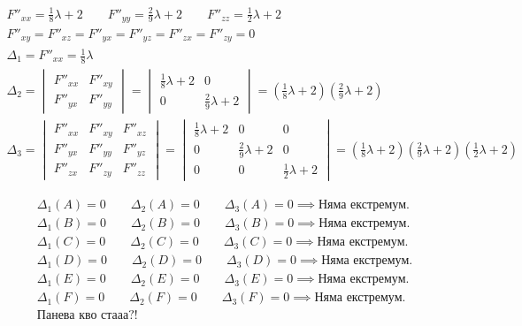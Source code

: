 \documentclass[a4paper,fleqn,12pt]{article}
\theoremstyle{definition}
\begin{document}
\begin{itemize}
\begin{gather*}
F''_{xx} = \frac{1}{8} \lambda + 2 \qquad  F''_{yy} = \frac{2}{9} \lambda + 2 \qquad  F''_{zz} = \frac{1}{2} \lambda + 2 \\
F''_{xy} = F''_{xz} = F''_{yx} = F''_{yz} = F''_{zx} = F''_{zy} = 0 \\ 
\Delta_1 = F''_{xx} =  \frac{1}{8} \lambda \\
\Delta_2 = \begin{vmatrix} F''_{xx} & F''_{xy} \\ F''_{yx} & F''_{yy} \end{vmatrix} = \begin{vmatrix} \frac{1}{8} \lambda + 2 & 0 \\  0 & \frac{2}{9} \lambda + 2  \end{vmatrix} = \left( \frac{1}{8} \lambda + 2 \right)\left( \frac{2}{9} \lambda + 2 \right) \\
\Delta_3 = \begin{vmatrix} F''_{xx} & F''_{xy} & F''_{xz}\\ F''_{yx} & F''_{yy} & F''_{yz} \\ F''_{zx} & F''_{zy} & F''_{zz}\end{vmatrix} = \begin{vmatrix} \frac{1}{8} \lambda + 2 & 0 & 0 \\0 & \frac{2}{9} \lambda + 2 & 0 \\ 0 & 0 & \frac{1}{2} \lambda + 2 \end{vmatrix} = \left( \frac{1}{8} \lambda + 2 \right)\left( \frac{2}{9} \lambda + 2 \right) \left( \frac{1}{2} \lambda + 2 \right)
\end{gather*}

\begin{gather*}
\Delta_1(A) = 0 \qquad \Delta_2(A) = 0 \qquad \Delta_3(A) = 0 \implies \text{Няма екстремум.}\\
\Delta_1(B) = 0 \qquad \Delta_2(B) = 0 \qquad \Delta_3(B) = 0 \implies \text{Няма екстремум.}\\
\Delta_1(C) = 0 \qquad \Delta_2(C) = 0 \qquad \Delta_3(C) = 0 \implies \text{Няма екстремум.}\\
\Delta_1(D) = 0 \qquad \Delta_2(D) = 0 \qquad \Delta_3(D) = 0 \implies \text{Няма екстремум.}\\
\Delta_1(E) = 0 \qquad \Delta_2(E) = 0 \qquad \Delta_3(E) = 0 \implies \text{Няма екстремум.}\\
\Delta_1(F) = 0 \qquad \Delta_2(F) = 0 \qquad \Delta_3(F) = 0 \implies \text{Няма екстремум.}\\
\text{Панева кво стааа?!}
\end{gather*}


\end{itemize}
\end{document}
